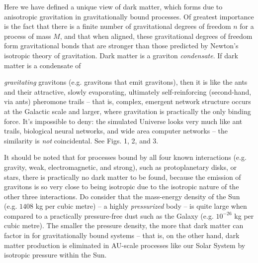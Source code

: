 \documentclass[12pt]{article}
\begin{document}
Here we have defined a unique view of dark matter, which forms due to anisotropic gravitation in gravitationally bound processes.
Of greatest importance is the fact that there is a finite number of gravitational degrees of freedom $n$ for a process of mass $M$, and that when aligned, these gravitational degrees of freedom form gravitational bonds that are stronger than those predicted by Newton's isotropic theory of gravitation.
Dark matter is a graviton {\textit{condensate}}.
If dark matter is a condensate of {\textit{gravitating} gravitons (e.g. gravitons that emit gravitons), then it is like the ants and their attractive, slowly evaporating, ultimately self-reinforcing (second-hand, via ants) pheromone trails -- that is, complex, emergent network structure occurs at the Galactic scale and larger, where gravitation is practically the only binding force.
It's impossible to deny: the simulated Universe looks very much like ant trails, biological neural networks, and wide area computer networks -- the similarity is {\textit{not}} coincidental.
See Figs. 1, 2, and 3.

It should be noted that for processes bound by all four known interactions (e.g. gravity, weak, electromagnetic, and strong), such as protoplanetary disks, or stars, there is practically no dark matter to be found, because the emission of gravitons is so very close to being isotropic due to the isotropic nature of the other three interactions.
Do consider that the mass-energy density of the Sun (e.g. $1408$ kg per cubic metre) -- a highly {\textit{pressurized}} body -- is quite large when compared to a practically pressure-free dust such as the Galaxy (e.g. $10^{-26}$ kg per cubic metre).
The smaller the pressure density, the more that dark matter can factor in for gravitationally bound systems -- that is, on the other hand, dark matter production is eliminated in AU-scale processes like our Solar System by isotropic pressure within the Sun.









}
\end{document}
